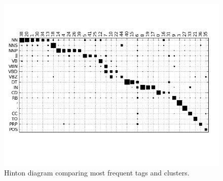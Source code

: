\begin{figure}[ht] \centering
\vspace*{-25mm}
\includegraphics[width=\textwidth]{hinton.png}
\vspace*{-30mm}
\caption{Hinton diagram comparing most frequent tags and clusters.}
\label{plot-hinton}
\end{figure}

